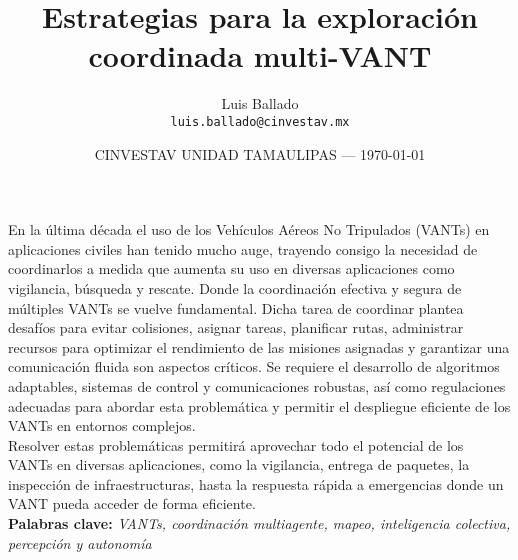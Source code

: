 \documentclass{article}
\title{Estrategias para la exploración coordinada multi-VANT}
\author{Luis Ballado\\ \texttt{luis.ballado@cinvestav.mx}} %
\date{CINVESTAV UNIDAD TAMAULIPAS --- \today}
\begin{document}
\maketitle

En la última década el uso de los Vehículos Aéreos No Tripulados (VANTs) en aplicaciones civiles han tenido mucho auge, trayendo consigo la necesidad de coordinarlos a medida que aumenta su uso en diversas aplicaciones como vigilancia, búsqueda y rescate. Donde la coordinación efectiva y segura de múltiples VANTs se vuelve fundamental. Dicha tarea de coordinar plantea desafíos para evitar colisiones, asignar tareas, planificar rutas, administrar recursos para optimizar el rendimiento de las misiones asignadas y garantizar una comunicación fluida son aspectos críticos. Se requiere el desarrollo de algoritmos adaptables, sistemas de control y comunicaciones robustas, así como regulaciones adecuadas para abordar esta problemática y permitir el despliegue eficiente de los VANTs en entornos complejos.\\

Resolver estas problemáticas permitirá aprovechar todo el potencial de los VANTs en diversas aplicaciones, como la vigilancia, entrega de paquetes, la inspección de infraestructuras, hasta la respuesta rápida a emergencias donde un VANT pueda acceder de forma eficiente.\\

\textbf{Palabras clave: } \textit{VANTs, coordinación multiagente, mapeo, inteligencia colectiva, percepción y autonomía}\\
\end{document}
